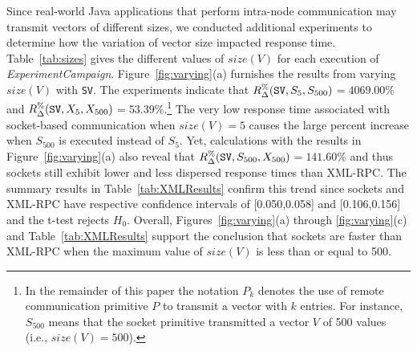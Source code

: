 \documentclass{sig-alternate}
\begin{document}
Since real-world Java applications that perform intra-node
communication may transmit vectors of different sizes, we conducted
additional experiments to determine how the variation of vector size
impacted response time.  Table~\ref{tab:sizes} gives the different
values of $size(V)$ for each execution of {\em ExperimentCampaign}.
Figure~\ref{fig:varying}(a) furnishes the results from varying
$size(V)$ with \texttt{SV}. The experiments indicate that {\small
  $R_\Delta^\%(\mbox{{\tt SV}},S_5,S_{500})$}$=4069.00\%$ and {\small
  $R_\Delta^\%(\mbox{{\tt
      SV}},X_5,X_{500})$}$=53.39\%$.\footnote{{\small In the remainder
    of this paper the notation $P_k$ denotes the use of remote
    communication primitive $P$ to transmit a vector with $k$ entries.
    For instance, $S_{500}$ means that the socket primitive
    transmitted a vector $V$ of 500 values (i.e., $size(V)=500$).}}
The very low response time associated with socket-based communication
when $size(V)=5$ causes the large percent increase when $S_{500}$ is
executed instead of $S_{5}$.  Yet, calculations with the results in
Figure~\ref{fig:varying}(a) also reveal that {\small
  $R_\Delta^\%(\mbox{{\tt SV}},S_{500},X_{500})$}$=141.60\%$ and thus
sockets still exhibit lower and less dispersed response times than
XML-RPC.  The summary results in Table~\ref{tab:XMLResults} confirm
this trend since sockets and XML-RPC have respective confidence
intervals of [0.050,0.058] and [0.106,0.156] and the t-test rejects
$H_0$.  Overall, Figures~\ref{fig:varying}(a) through
\ref{fig:varying}(c) and Table~\ref{tab:XMLResults} support the
conclusion that sockets are faster than XML-RPC when the maximum value
of $size(V)$ is less than or equal to 500.
\end{document}
